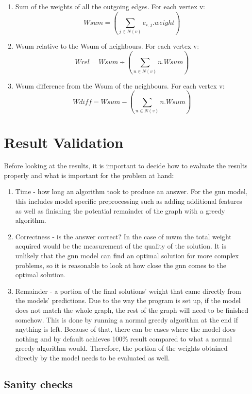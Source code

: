 \begin{enumerate}
\item Sum of the weights of all the outgoing edges. For each vertex v: \[ Wsum = (\sum_{j \in N(v)} e_{v,j}.weight) \]
\item Wsum relative to the Wsum of neighbours. For each vertex v:  \[ Wrel = Wsum \div (\sum_{n \in {N(v)}} n.Wsum) \]
\item Wsum difference from the Wsum of the neighbours. For each vertex v: \[ Wdiff = Wsum - (\sum_{n \in {N(v)}} n.Wsum) \]
\end{enumerate}

\section{Result Validation}

Before looking at the results, it is important to decide how to evaluate the results properly and what is important for the problem at hand:

\begin{enumerate}
\item Time - how long an algorithm took to produce an answer. For the \gls{gnn} model, this includes model specific preprocessing such as adding additional features as well as finishing the potential remainder of the graph with a greedy algorithm.
\item Correctness - is the answer correct? In the case of \gls{mwm} the total weight acquired would be the measurement of the quality of the solution. It is unlikely that the \gls{gnn} model can find an optimal solution for more complex problems, so it is reasonable to look at how close the \gls{gnn} comes to the optimal solution.
\item Remainder - a portion of the final solutions' weight that came directly from the models' predictions. Due to the way the program is set up, if the model does not match the whole graph, the rest of the graph will need to be finished somehow. This is done by running a normal greedy algorithm at the end if anything is left. Because of that, there can be cases where the model does nothing and by default achieves 100\% result compared to what a normal greedy algorithm would. Therefore, the portion of the weights obtained directly by the model needs to be evaluated as well.
\end{enumerate}

\subsection{Sanity checks}

